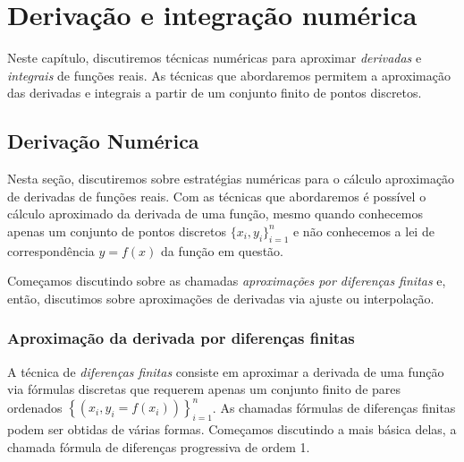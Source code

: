 
%

\chapter{Derivação e integração numérica}

Neste capítulo, discutiremos técnicas numéricas para aproximar \emph{derivadas} e \emph{integrais} de funções reais. As técnicas que abordaremos permitem a aproximação das derivadas e integrais a partir de um conjunto finito de pontos discretos.

\section{Derivação Numérica}

Nesta seção, discutiremos sobre estratégias numéricas para o cálculo aproximação de derivadas de funções reais. Com as técnicas que abordaremos é possível o cálculo aproximado da derivada de uma função, mesmo quando conhecemos apenas um conjunto de pontos discretos $\{x_i, y_i\}_{i=1}^n$ e não conhecemos a lei de correspondência $y = f(x)$ da função em questão.

Começamos discutindo sobre as chamadas \emph{aproximações por diferenças finitas} e, então, discutimos sobre aproximações de derivadas via ajuste ou interpolação.

\subsection{Aproximação da derivada por diferenças finitas}

A técnica de \emph{diferenças finitas} consiste em aproximar a derivada de uma função via fórmulas discretas que requerem apenas um conjunto finito de pares ordenados $\left\{\left(x_i, y_i=f(x_i)\right)\right\}_{i=1}^n$. As chamadas fórmulas de diferenças finitas podem ser obtidas de várias formas. Começamos discutindo a mais básica delas, a chamada fórmula de diferenças progressiva de ordem 1.

